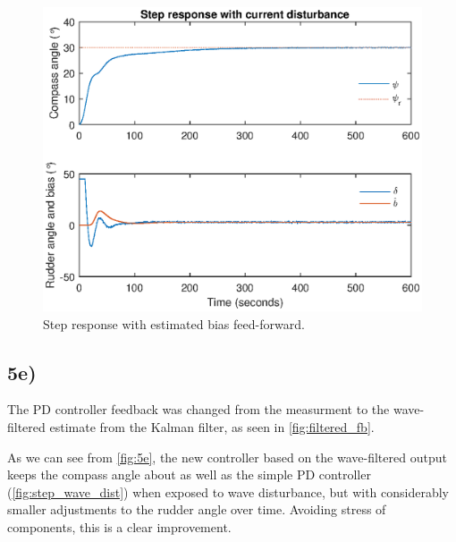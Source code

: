 \begin{figure}
    \centering
    \includegraphics[width=\textwidth]{images/oppg5/5d.eps}
    \caption{Step response with estimated bias feed-forward.}
    \label{fig:5d}
\end{figure}


\subsection{5e)}

The PD controller feedback was changed from the measurment to the wave-filtered estimate from the Kalman filter, as seen in \cref{fig:filtered_fb}.

As we can see from \cref{fig:5e}, the new controller based on the wave-filtered output keeps the compass angle about as well as the simple PD controller (\cref{fig:step_wave_dist}) when exposed to wave disturbance, but with considerably smaller adjustments to the rudder angle over time. Avoiding stress of components, this is a clear improvement.

